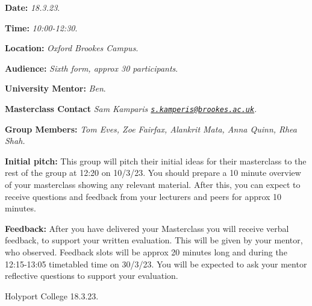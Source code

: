 \documentclass[
]{book}
\newenvironment{information}{
  \definecolor{shadecolor}{rgb}{0.8, 0.9,1.0}
  \definecolor{text-colour}{rgb}{0, 0.25, 0.52}
  \color{text-colour}
  \begin{shaded}}
 {\end{shaded}}
\begin{document}
\begin{information}
\textbf{Date:} \emph{18.3.23}.

\textbf{Time:} \emph{10:00-12:30}.

\textbf{Location:} \emph{Oxford Brookes Campus}.

\textbf{Audience:} \emph{Sixth form, approx 30 participants}.

\textbf{University Mentor:} \emph{Ben}.

\textbf{Masterclass Contact} \emph{Sam Kamparis \href{mailto:s.kamperis@brookes.ac.uk}{\nolinkurl{s.kamperis@brookes.ac.uk}}}.

\textbf{Group Members:} \emph{Tom Eves, Zoe Fairfax, Alankrit Mata, Anna Quinn, Rhea Shah.}

\textbf{Initial pitch:} This group will pitch their initial ideas for their masterclass to the rest of the group at 12:20 on 10/3/23. You should prepare a 10 minute overview of your masterclass showing any relevant material. After this, you can expect to receive questions and feedback from your lecturers and peers for approx 10 minutes.

\textbf{Feedback:} After you have delivered your Masterclass you will receive verbal feedback, to support your written evaluation. This will be given by your mentor, who observed. Feedback slots will be approx 20 minutes long and during the 12:15-13:05 timetabled time on 30/3/23. You will be expected to ask your mentor reflective questions to support your evaluation.

\end{information}

Holyport College 18.3.23.
\end{document}
